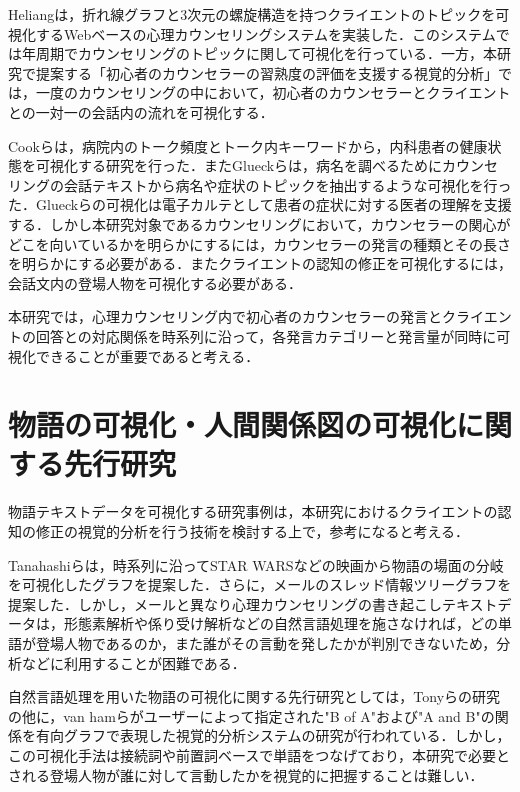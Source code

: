 \documentclass[shuuron]{kuee}
\begin{document}


Heliang\cite{shou}は，折れ線グラフと3次元の螺旋構造を持つクライエントのトピックを可視化するWebベースの心理カウンセリングシステムを実装した．このシステムでは年周期でカウンセリングのトピックに関して可視化を行っている．一方，本研究で提案する「初心者のカウンセラーの習熟度の評価を支援する視覚的分析」では，一度のカウンセリングの中において，初心者のカウンセラーとクライエントとの一対一の会話内の流れを可視化する．

Cookら\cite{cook2014monologger}は，病院内のトーク頻度とトーク内キーワードから，内科患者の健康状態を可視化する研究を行った．またGlueckら\cite{glueck2018phenolines}は，病名を調べるためにカウンセリングの会話テキストから病名や症状のトピックを抽出するような可視化を行った．Glueckらの可視化は電子カルテとして患者の症状に対する医者の理解を支援する．しかし本研究対象であるカウンセリングにおいて，カウンセラーの関心がどこを向いているかを明らかにするには，カウンセラーの発言の種類とその長さを明らかにする必要がある．またクライエントの認知の修正を可視化するには，会話文内の登場人物を可視化する必要がある．


本研究では，心理カウンセリング内で初心者のカウンセラーの発言とクライエントの回答との対応関係を時系列に沿って，各発言カテゴリーと発言量が同時に可視化できることが重要であると考える．


\section{物語の可視化・人間関係図の可視化に関する先行研究}%

物語テキストデータを可視化する研究事例は，本研究におけるクライエントの認知の修正の視覚的分析を行う技術を検討する上で，参考になると考える．

Tanahashiら\cite{tanahashi2012design}は，時系列に沿ってSTAR WARSなどの映画から物語の場面の分岐を可視化したグラフを提案した．さらに，メールのスレッド情報ツリーグラフを提案した\cite{tanahashi2015efficient}．しかし，メールと異なり心理カウンセリングの書き起こしテキストデータは，形態素解析や係り受け解析などの自然言語処理を施さなければ，どの単語が登場人物であるのか，また誰がその言動を発したかが判別できないため，分析などに利用することが困難である．

自然言語処理を用いた物語の可視化に関する先行研究としては，Tonyら\cite{bergstrom2007seeing}の研究の他に，van hamら\cite{van2009mapping}がユーザーによって指定された"B of A"および"A and B"の関係を有向グラフで表現した視覚的分析システムの研究が行われている．しかし，この可視化手法は接続詞や前置詞ベースで単語をつなげており，本研究で必要とされる登場人物が誰に対して言動したかを視覚的に把握することは難しい．
\end{document}

